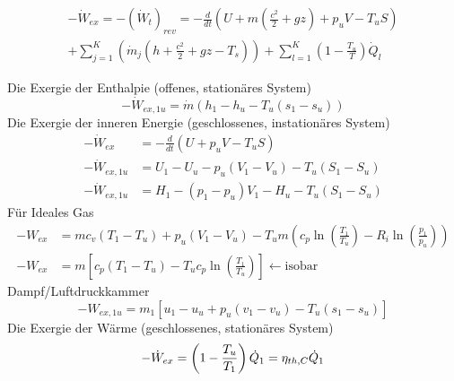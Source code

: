 \documentclass[twocolumn]{article}
\begin{document}
\begin{multline*}
	-\dot{W}_{ex} = - (\dot{W}_t)_{rev} = -\frac{d}{dt} \left( U + m\left ( \frac{c^2}{2}+ gz \right) + p_uV - T_uS \right) \\  +  \sum_{j=1}^{K} \left(\dot{m}_j \left(h + \frac{c^2}{2} + gz -T_s \right) \right) + \sum_{l=1}^{K} \left( 1 - \frac{T_u}{T}\right) \dot{Q}_l 
\end{multline*}


Die Exergie der Enthalpie (offenes, stationäres System)
\begin{equation*}
	-\dot{W}_{ex,1u} = \dot{m}(h_1 - h_u -T_u(s_1 - s_u))
\end{equation*}
Die Exergie der inneren Energie (geschlossenes, instationäres System)
\begin{align*}
	- \dot{W}_{ex} &= - \frac{d}{dt}(U + p_uV -T_uS) \\
	-\dot{W}_{ex,1u} &= U_1 - U_u -p_u(V_1 - V_u) - T_u(S_1 - S_u) \\
	-\dot{W}_{ex,1u} &= H_1 - (p_1-p_u)V_1 - H_u- T_u(S_1 - S_u)
\end{align*}
Für Ideales Gas \\
\begin{align*}
	-W_{ex} &= mc_v(T_1 -T_u) + p_u(V_1 - V_u) - T_um \left(c_p \ln \left(\frac{T_1}{T_u}\right) -R_i \ln \left(\frac{p_1}{p_u}\right)\right) \\
	-W_{ex} &= m \left[c_p(T_1 - T_u) -T_u c_p \ln \left(\frac{T_1}{T_u}\right)\right] \leftarrow \text{isobar}
\end{align*}
Dampf/Luftdruckkammer
\begin{equation*}
	-W_{ex,1u} = m_1 [ u_1 - u_u + p_u ( v_1 - v_u) - T_u(s_1 - s_u)]
\end{equation*}
Die Exergie der Wärme (geschlossenes, stationäres System)
\begin{equation*}
	- \dot{W}_{ex} = \left(1 - \frac{T_u}{T_1} \right) \dot{Q}_1 = \eta_{th,C} \dot{Q}_1 \\
\end{equation*}
\end{document}
